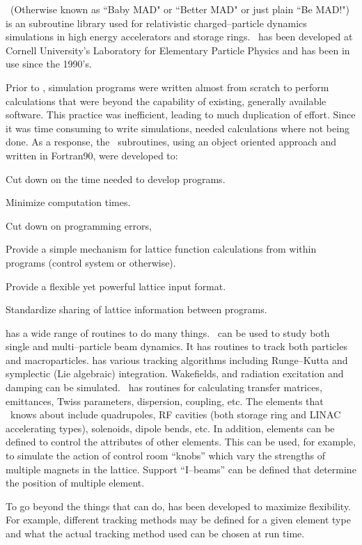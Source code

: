 
\bmad\ (Otherwise known as ``Baby MAD" or ``Better MAD" or just plain
``Be MAD!")  is an subroutine library used for relativistic
charged--particle dynamics simulations in high energy accelerators and
storage rings. \bmad\ has been developed at Cornell University's
Laboratory for Elementary Particle Physics and has been in use since
the 1990's. 

Prior to \bmad, simulation programs were written almost from scratch to perform
calculations that were beyond the capability of existing, generally
available software. This practice was inefficient, leading to much
duplication of effort.  Since it was time consuming to write
simulations, needed calculations where not being done.  As a response,
the \bmad\ subroutines, using an object oriented approach and written
in Fortran90, were developed to:
\begin{Itemize}
\item Cut down on the time needed to develop programs.
\item Minimize computation times.
\item Cut down on programming errors, 
\item Provide a simple mechanism for lattice function calculations
from within programs (control system or otherwise).
\item Provide a flexible yet powerful lattice input format.
\item Standardize sharing of lattice information between 
programs.
\end{Itemize}

\bmad has a wide range of routines to do many things.  \bmad\ can be
used to study both single and multi--particle beam dynamics.  It has
routines to track both particles and macroparticles. \bmad has various
tracking algorithms including Runge--Kutta and symplectic (Lie
algebraic) integration.  Wakefields, and radiation excitation and
damping can be simulated. \bmad\ has routines for calculating transfer
matrices, emittances, Twiss parameters, dispersion, coupling, etc. The
elements that \bmad\ knows about include quadrupoles, RF cavities
(both storage ring and LINAC accelerating types), solenoids, dipole
bends, etc. In addition, elements can be defined to control the
attributes of other elements. This can be used, for example, to
simulate the action of control room ``knobs'' which vary the strengths
of multiple magnets in the lattice. Support ``I--beams'' can be
defined that determine the position of multiple element. 

To go beyond the things that \bmad can do, \bmad has been developed
to maximize flexibility. For example, different tracking methods may
be defined for a given element type and what the actual tracking
method used can be chosen at run time.


\vfill
\break
